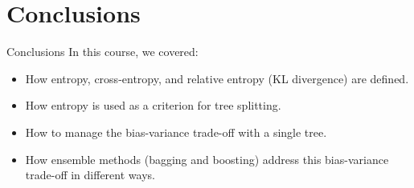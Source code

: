 \section{Conclusions}

\begin{frame}{Conclusions}
	In this course, we covered:
	\begin{itemize}
		\item How entropy, cross-entropy, and relative entropy (KL divergence) are defined.
		\item How entropy is used as a criterion for tree splitting.
		\item How to manage the bias-variance trade-off with a single tree.
		\item How ensemble methods (bagging and boosting) address this bias-variance trade-off in different ways.
	\end{itemize}
\end{frame}